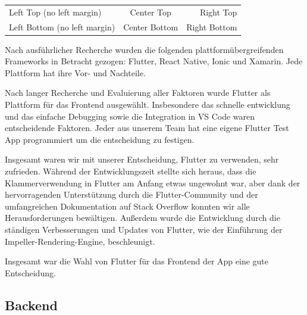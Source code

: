 \begin{tabular}{|@{Row:}l|c||r|}
    Left Top (no left margin)    & Center Top    & Right Top    \\
    Left Bottom (no left margin) & Center Bottom & Right Bottom
\end{tabular}

Nach ausführlicher Recherche wurden die folgenden plattformübergreifenden Frameworks in Betracht gezogen\cite{cross_platform_framework_comparison}: Flutter, React Native, Ionic und Xamarin. Jede Plattform hat ihre Vor- und Nachteile.

Nach langer Recherche und Evaluierung aller Faktoren wurde Flutter als Plattform für das Frontend ausgewählt. Insbesondere das schnelle entwicklung und das einfache Debugging sowie die Integration in VS Code waren entscheidende Faktoren. Jeder aus unserem Team hat eine eigene Flutter Test App programmiert \cite{flutter_test_apps} um die entscheidung zu festigen.

Insgesamt waren wir mit unserer Entscheidung, Flutter zu verwenden, sehr zufrieden. Während der Entwicklungszeit stellte sich heraus, dass die Klammerverwendung in Flutter am Anfang etwas ungewohnt war, aber dank der hervorragenden Unterstützung durch die Flutter-Community und der umfangreichen Dokumentation auf Stack Overflow konnten wir alle Herausforderungen bewältigen. Außerdem wurde die Entwicklung durch die ständigen Verbesserungen und Updates von Flutter, wie der Einführung der Impeller-Rendering-Engine, beschleunigt. \cite{flutter_impeller}

Insgesamt war die Wahl von Flutter für das Frontend der App eine gute Entscheidung.

\subsection
{Backend}



